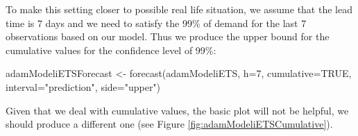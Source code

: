\documentclass[
]{book}
\newenvironment{Shaded}{\begin{snugshade}}{\end{snugshade}}
\newcommand{\AttributeTok}[1]{\textcolor[rgb]{0.77,0.63,0.00}{#1}}
\newcommand{\ConstantTok}[1]{\textcolor[rgb]{0.00,0.00,0.00}{#1}}
\newcommand{\DecValTok}[1]{\textcolor[rgb]{0.00,0.00,0.81}{#1}}
\newcommand{\FunctionTok}[1]{\textcolor[rgb]{0.00,0.00,0.00}{#1}}
\newcommand{\NormalTok}[1]{#1}
\newcommand{\OtherTok}[1]{\textcolor[rgb]{0.56,0.35,0.01}{#1}}
\newcommand{\SpecialCharTok}[1]{\textcolor[rgb]{0.00,0.00,0.00}{#1}}
\newcommand{\StringTok}[1]{\textcolor[rgb]{0.31,0.60,0.02}{#1}}
\theoremstyle{definition}
\theoremstyle{definition}
\theoremstyle{definition}
\theoremstyle{definition}
\theoremstyle{remark}
\begin{document}
To make this setting closer to possible real life situation, we assume that the lead time is 7 days and we need to satisfy the 99\% of demand for the last 7 observations based on our model. Thus we produce the upper bound for the cumulative values for the confidence level of 99\%:

\begin{Shaded}
\begin{Highlighting}[]
\NormalTok{adamModeliETSForecast }\OtherTok{\textless{}{-}} \FunctionTok{forecast}\NormalTok{(adamModeliETS, }\AttributeTok{h=}\DecValTok{7}\NormalTok{,}
                                  \AttributeTok{cumulative=}\ConstantTok{TRUE}\NormalTok{,}
                                  \AttributeTok{interval=}\StringTok{"prediction"}\NormalTok{,}
                                  \AttributeTok{side=}\StringTok{"upper"}\NormalTok{)}
\end{Highlighting}
\end{Shaded}

Given that we deal with cumulative values, the basic plot will not be helpful, we should produce a different one (see Figure \ref{fig:adamModeliETSCumulative}).

\begin{Shaded}
\end{Shaded}
\end{document}
